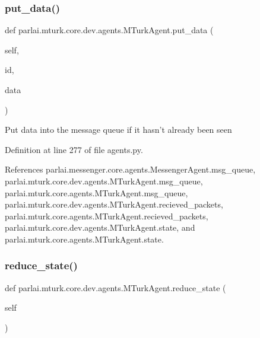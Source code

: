 \subsubsection{\texorpdfstring{put\+\_\+data()}{put\_data()}}
{\footnotesize\ttfamily def parlai.\+mturk.\+core.\+dev.\+agents.\+M\+Turk\+Agent.\+put\+\_\+data (\begin{DoxyParamCaption}\item[{}]{self,  }\item[{}]{id,  }\item[{}]{data }\end{DoxyParamCaption})}

\begin{DoxyVerb}Put data into the message queue if it hasn't already been seen\end{DoxyVerb}
 

Definition at line 277 of file agents.\+py.



References parlai.\+messenger.\+core.\+agents.\+Messenger\+Agent.\+msg\+\_\+queue, parlai.\+mturk.\+core.\+dev.\+agents.\+M\+Turk\+Agent.\+msg\+\_\+queue, parlai.\+mturk.\+core.\+agents.\+M\+Turk\+Agent.\+msg\+\_\+queue, parlai.\+mturk.\+core.\+dev.\+agents.\+M\+Turk\+Agent.\+recieved\+\_\+packets, parlai.\+mturk.\+core.\+agents.\+M\+Turk\+Agent.\+recieved\+\_\+packets, parlai.\+mturk.\+core.\+dev.\+agents.\+M\+Turk\+Agent.\+state, and parlai.\+mturk.\+core.\+agents.\+M\+Turk\+Agent.\+state.

\mbox{\label{classparlai_1_1mturk_1_1core_1_1dev_1_1agents_1_1MTurkAgent_ade350517a74213389452642c625bc612}} 
\subsubsection{\texorpdfstring{reduce\+\_\+state()}{reduce\_state()}}
{\footnotesize\ttfamily def parlai.\+mturk.\+core.\+dev.\+agents.\+M\+Turk\+Agent.\+reduce\+\_\+state (\begin{DoxyParamCaption}\item[{}]{self }\end{DoxyParamCaption})}

